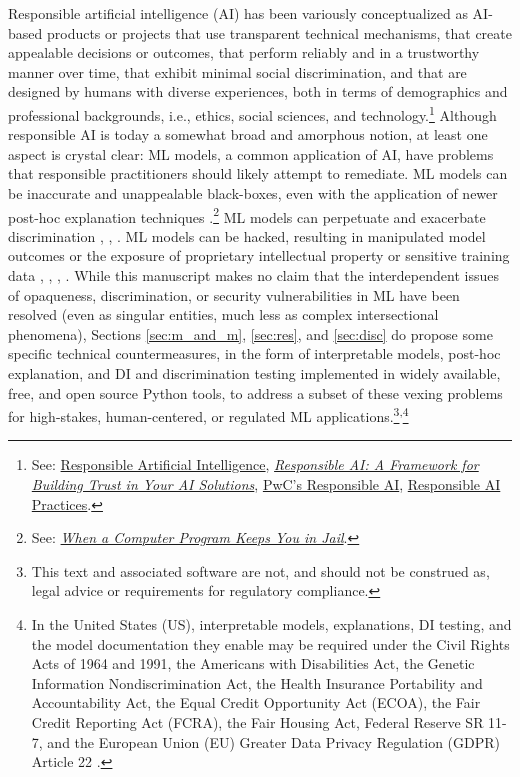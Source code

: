 \documentclass[information,article,submit,moreauthors,pdftex]{definitions/mdpi}
\begin{document}
Responsible artificial intelligence (AI) has been variously conceptualized as AI-based products or projects that use transparent technical mechanisms, that create appealable decisions or outcomes, that perform reliably and in a trustworthy manner over time, that exhibit minimal social discrimination, and that are designed by humans with diverse experiences, both in terms of demographics and professional backgrounds, i.e., ethics, social sciences, and technology.\footnote{See: \href{https://ec.europa.eu/jrc/communities/sites/jrccties/files/03_dignum_v.pdf}{Responsible Artificial Intelligence}, \href{https://www.accenture.com/_acnmedia/pdf-92/accenture-afs-responsible-ai.pdf}{\textit{Responsible AI: A Framework for Building Trust in Your AI Solutions}}, \href{https://www.pwc.com/us/en/services/consulting/analytics/artificial-intelligence/what-is-responsible-ai.html}{PwC's Responsible AI}, \href{https://ai.google/responsibilities/responsible-ai-practices/}{Responsible AI Practices}.} Although responsible AI is today a somewhat broad and amorphous notion, at least one aspect is crystal clear: ML models, a common application of AI, have problems that responsible practitioners should likely attempt to remediate. ML models can be inaccurate and unappealable black-boxes, even with the application of newer post-hoc explanation techniques \cite{please_stop}.\footnote{See: \href{https://www.nytimes.com/2017/06/13/opinion/how-computers-are-harming-criminal-justice.html}{\textit{When a Computer Program Keeps You in Jail}}.} ML models can perpetuate and exacerbate discrimination \cite{feldman2015certifying}, \cite{dwork2012fairness}, \cite{gender_shades}.  ML models can be hacked, resulting in manipulated model outcomes or the exposure of proprietary intellectual property or sensitive training data \cite{security_of_ml}, \cite{model_stealing}, \cite{membership_inference}, \cite{shokri2019privacy}. While this manuscript makes no claim that the interdependent issues of opaqueness, discrimination, or security vulnerabilities in ML have been resolved (even as singular entities, much less as complex intersectional phenomena), Sections \ref{sec:m_and_m}, \ref{sec:res}, and \ref{sec:disc} do propose some specific technical countermeasures, in the form of interpretable models, post-hoc explanation, and DI and discrimination testing implemented in widely available, free, and open source Python tools, to address a subset of these vexing problems for high-stakes, human-centered, or regulated ML applications.\footnote{This text and associated software are not, and should not be construed as, legal advice or requirements for regulatory compliance.}\textsuperscript{,}\footnote{In the United States (US), interpretable models, explanations, DI testing, and the model documentation they enable may be required under the Civil Rights Acts of 1964 and 1991, the Americans with Disabilities Act, the Genetic Information Nondiscrimination Act, the Health Insurance Portability and Accountability Act, the Equal Credit Opportunity Act (ECOA), the Fair Credit Reporting Act (FCRA), the Fair Housing Act, Federal Reserve SR 11-7, and the European Union (EU) Greater Data Privacy Regulation (GDPR) Article 22 \cite{ff_interpretability}.}
\end{document}
